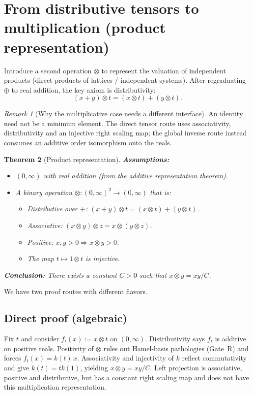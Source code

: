 \documentclass[11pt]{article}
\newtheorem{theorem}{Theorem}[section]
\theoremstyle{definition}
\theoremstyle{remark}
\newtheorem{remark}[theorem]{Remark}
\begin{document}
\newpage
\section{From distributive tensors to multiplication (product representation)}
\label{sec:product_rep}

Introduce a second operation $\otimes$ to represent the valuation of independent products
(direct products of lattices / independent systems). After regraduating $\oplus$ to real addition,
the key axiom is distributivity:
\[
(x+y)\otimes t = (x\otimes t) + (y\otimes t).
\]

\begin{remark}[Why the multiplicative case needs a different interface]
An identity need not be a minimum element. The direct tensor route uses
associativity, distributivity and an injective right scaling map; the global
inverse route instead consumes an additive order isomorphism onto the reals.
\end{remark}

\begin{theorem}[Product representation]
\textbf{Assumptions:}
\begin{itemize}
\item $(0,\infty)$ with real addition (from the additive representation theorem).
\item A binary operation $\otimes : (0,\infty)^2 \to (0,\infty)$ that is:
  \begin{itemize}
  \item Distributive over $+$: $(x+y)\otimes t = (x\otimes t)+(y\otimes t)$.
  \item Associative: $(x\otimes y)\otimes z = x\otimes(y\otimes z)$.
  \item Positive: $x,y>0 \Rightarrow x\otimes y > 0$.
  \item The map $t\mapsto1\otimes t$ is injective.
  \end{itemize}
\end{itemize}
\textbf{Conclusion:}
There exists a constant $C>0$ such that $x\otimes y = xy/C$.
\end{theorem}

We have two proof routes with different flavors.

\subsection{Direct proof (algebraic)}

Fix $t$ and consider $f_t(x) := x\otimes t$ on $(0,\infty)$.
Distributivity says $f_t$ is additive on positive reals.  Positivity of $\otimes$ rules out
Hamel-basis pathologies (Gate~R) and forces $f_t(x)=k(t)\,x$.
Associativity and injectivity of $k$ reflect commutativity and give
$k(t)=tk(1)$, yielding $x\otimes y=xy/C$.
Left projection is associative, positive and distributive, but has a constant
right scaling map and does not have this multiplication representation.
\end{document}
